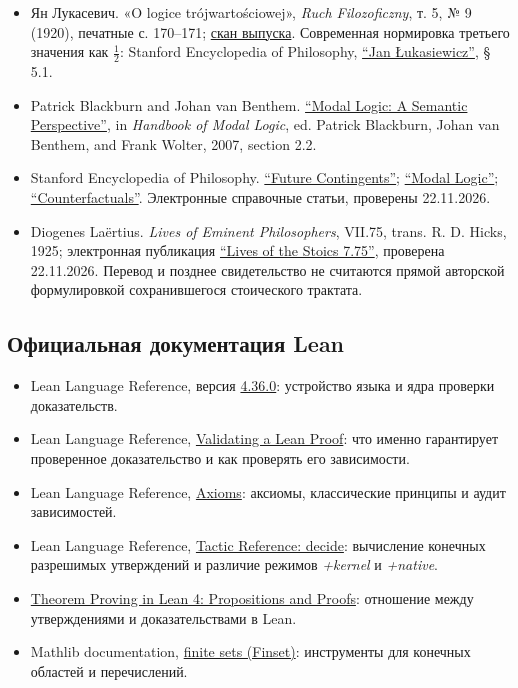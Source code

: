 \documentclass[12pt,a4paper]{article}
\begin{document}
\begin{itemize}
\item Ян Лукасевич. «O logice trójwartościowej», \emph{Ruch Filozoficzny}, т. 5, № 9 (1920), печатные с. 170–171; \href{https://kpbc.umk.pl/Content/247342/PDF/EOD_OPEN_006_12_nr_09.pdf}{скан выпуска}. Современная нормировка третьего значения как \(\tfrac12\): Stanford Encyclopedia of Philosophy, \href{https://plato.stanford.edu/entries/lukasiewicz/}{“Jan Łukasiewicz”}, § 5.1.
\item Patrick Blackburn and Johan van Benthem. \href{https://doi.org/10.1016/S1570-2464(07)80004-8}{“Modal Logic: A Semantic Perspective”}, in \emph{Handbook of Modal Logic}, ed. Patrick Blackburn, Johan van Benthem, and Frank Wolter, 2007, section 2.2.
\item Stanford Encyclopedia of Philosophy. \href{https://plato.stanford.edu/entries/future-contingents/}{“Future Contingents”}; \href{https://plato.stanford.edu/entries/logic-modal/}{“Modal Logic”}; \href{https://plato.stanford.edu/entries/counterfactuals/}{“Counterfactuals”}. Электронные справочные статьи, проверены 22.11.2026.
\item Diogenes Laërtius. \emph{Lives of Eminent Philosophers}, VII.75, trans. R. D. Hicks, 1925; электронная публикация \href{https://www.whatwouldstoicsdo.com/passage/lives-of-the-stoics/7.75}{“Lives of the Stoics 7.75”}, проверена 22.11.2026. Перевод и позднее свидетельство не считаются прямой авторской формулировкой сохранившегося стоического трактата.
\end{itemize}
\subsection{Официальная документация Lean}

\begin{itemize}
\item Lean Language Reference, версия \href{https://lean-lang.org/doc/reference/4.36.0/}{4.36.0}: устройство языка и ядра проверки доказательств.
\item Lean Language Reference, \href{https://lean-lang.org/doc/reference/4.36.0/ValidatingProofs/}{Validating a Lean Proof}: что именно гарантирует проверенное доказательство и как проверять его зависимости.
\item Lean Language Reference, \href{https://lean-lang.org/doc/reference/4.36.0/Axioms/}{Axioms}: аксиомы, классические принципы и аудит зависимостей.
\item Lean Language Reference, \href{https://lean-lang.org/doc/reference/4.36.0/Tactic-Proofs/Tactic-Reference/}{Tactic Reference: decide}: вычисление конечных разрешимых утверждений и различие режимов \emph{+kernel} и \emph{+native}.
\item \href{https://lean-lang.org/theorem_proving_in_lean4/Propositions-and-Proofs/}{Theorem Proving in Lean 4: Propositions and Proofs}: отношение между утверждениями и доказательствами в Lean.
\item Mathlib documentation, \href{https://leanprover-community.github.io/mathlib4_docs/Mathlib/Data/Finset/Defs.html}{finite sets (Finset)}: инструменты для конечных областей и перечислений.
\end{itemize}
\end{document}
